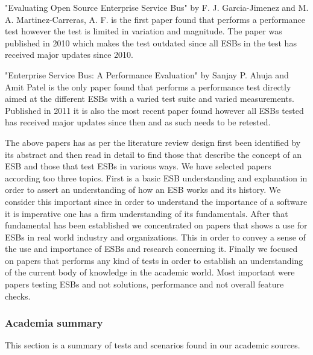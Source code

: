 "Evaluating Open Source Enterprise Service Bus" \cite{Garcia2010} by F. J. Garcia-Jimenez and M. A. Martinez-Carreras, A. F. is the first paper found that performs a performance test however the test is limited in variation and magnitude. The paper was published in 2010 which makes the test outdated since all ESBs in the test has received major updates since 2010.


"Enterprise Service Bus: A Performance Evaluation" \cite{Sanjay2011} by Sanjay P. Ahuja and Amit Patel  is the only paper found that performs a performance test directly aimed at the different ESBs with a varied test suite and varied measurements. Published in 2011 it is also the most recent paper found however all ESBs tested has received major updates since then and as such needs to be retested.

The above papers has as per the literature review design first been identified by its abstract and then read in detail to find those that describe the concept of an ESB and those that test ESBs in various ways. We have selected papers according too three topics. First is a basic ESB understanding and explanation in order to assert an understanding of how an ESB works and its history. We consider this important since in order to understand the importance of a software it is imperative one has a firm understanding of its fundamentals. After that fundamental has been established we concentrated on papers that shows a use for ESBs in real world industry and organizations. This in order to convey a sense of the use and importance of ESBs and research concerning it.
Finally we focused on papers that performs any kind of tests in order to establish an understanding of the current body of knowledge in the academic world. Most important were papers testing ESBs and not solutions, performance and not overall feature checks.


\subsubsection{Academia summary}
This section is a summary of tests and scenarios found in our academic sources.

